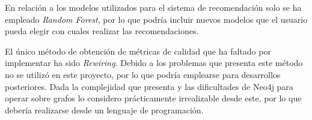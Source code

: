 En relación a los modelos utilizados para el sistema de recomendación solo se ha empleado \textit{Random Forest}, por lo que podría incluir nuevos modelos que el usuario pueda elegir con cuales realizar las recomendaciones.

El único método de obtención de métricas de calidad que ha faltado por implementar ha sido \textit{Rewiring}. Debido a los problemas que presenta este método no se utilizó en este proyecto, por lo que podría emplearse para desarrollos posteriores. Dada la complejidad que presenta y las dificultades de Neo4j para operar sobre grafos lo considero prácticamente irrealizable desde este, por lo que debería realizarse desde un lenguaje de programación.